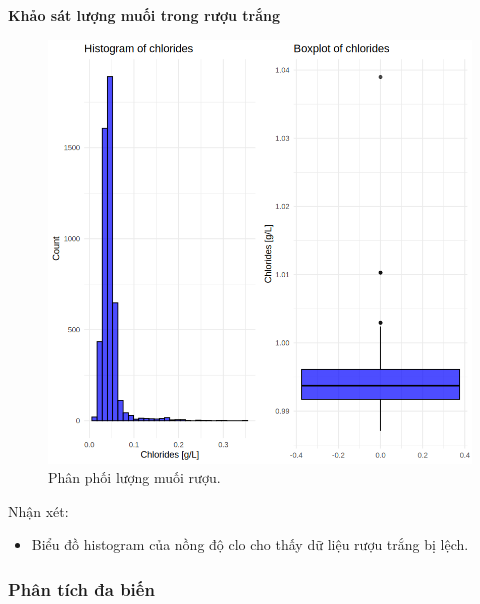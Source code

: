 \textbf{Khảo sát lượng muối trong rượu trắng}
\begin{figure}[H]
    \centering
    \includegraphics[width=0.75\columnwidth]{wine_figures/white_chlorides.png}
    \caption{Phân phối lượng muối rượu.}
    \label{fig:white_chlorides}
\end{figure}
Nhận xét:
\begin{itemize}
    \item Biểu đồ histogram của nồng độ clo cho thấy dữ liệu rượu trắng bị lệch.
\end{itemize}

\subsubsection{Phân tích đa biến}

